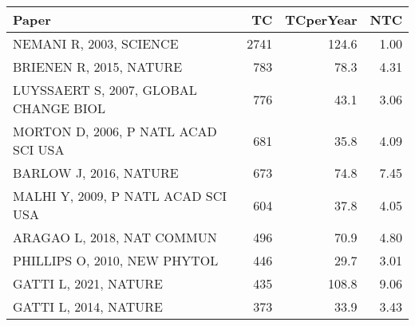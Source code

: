 
\begin{tabular}{lrrr}
\toprule
Paper & TC & TCperYear & NTC\\
\midrule
NEMANI R, 2003, SCIENCE & 2741 & 124.6 & 1.00\\
BRIENEN R, 2015, NATURE & 783 & 78.3 & 4.31\\
LUYSSAERT S, 2007, GLOBAL CHANGE BIOL & 776 & 43.1 & 3.06\\
MORTON D, 2006, P NATL ACAD SCI USA & 681 & 35.8 & 4.09\\
BARLOW J, 2016, NATURE & 673 & 74.8 & 7.45\\
\addlinespace
MALHI Y, 2009, P NATL ACAD SCI USA & 604 & 37.8 & 4.05\\
ARAGAO L, 2018, NAT COMMUN & 496 & 70.9 & 4.80\\
PHILLIPS O, 2010, NEW PHYTOL & 446 & 29.7 & 3.01\\
GATTI L, 2021, NATURE & 435 & 108.8 & 9.06\\
GATTI L, 2014, NATURE & 373 & 33.9 & 3.43\\
\bottomrule
\end{tabular}